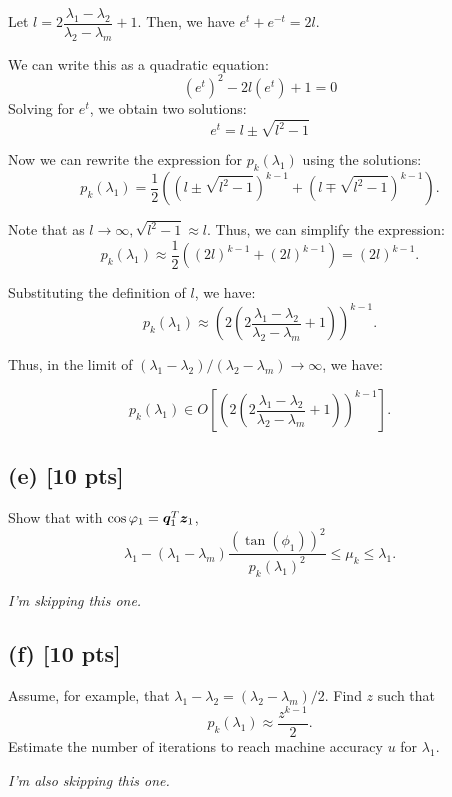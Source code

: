 \documentclass[twoside,10pt]{article}
\begin{document}
Let $l = 2\dfrac{\lambda_1 - \lambda_2}{\lambda_2 - \lambda_m} + 1$.
Then, we have $e^t + e^{-t} = 2l.$

We can write this as a quadratic equation:
$$(e^t)^2 - 2l(e^t) + 1 = 0$$
Solving for $e^t$, we obtain two solutions:
$$e^t = l \pm \sqrt{l^2 - 1}$$

Now we can rewrite the expression for $p_k(\lambda_1)$ using the solutions:
$$p_k(\lambda_1) = \frac{1}{2}\left( (l \pm \sqrt{l^2 - 1})^{k-1} + (l \mp \sqrt{l^2 - 1})^{k-1} \right).$$

Note that as $l \rightarrow \infty, \sqrt{l^2 - 1} \approx l$.
Thus, we can simplify the expression:
$$p_k(\lambda_1) \approx \frac{1}{2}\left( (2l)^{k-1} + (2l)^{k-1}\right) = (2l)^{k-1}.$$

Substituting the definition of $l$, we have:
$$p_k(\lambda_1) \approx \left(2 \left(2 \frac{\lambda_1 - \lambda_2}{\lambda_2 - \lambda_m} + 1\right)\right)^{k - 1}.$$

Thus, in the limit of $(\lambda_{1} - \lambda_{2}) / (\lambda_{2} - \lambda_{m}) \rightarrow \infty$, we have:

$$p_k(\lambda_1) \in O\left[ \left(2 \left(2 \frac{\lambda_1 - \lambda_2}{\lambda_2 - \lambda_m} + 1\right)\right)^{k - 1} \right].$$

\subsection*{(e) [10 pts]}
Show that with $\cos{\varphi_1} = \bm{q}_1^T \bm{z}_1$, 
\begin{equation}
  \lambda_{1} - (\lambda_{1} - \lambda_{m}) \frac{(\tan (\phi_1))^2}{p_{k}(\lambda_1)^2} \leq \mu_{k} \leq \lambda_1.
\end{equation}

\textit{I'm skipping this one.}

\subsection*{(f) [10 pts]}

Assume, for example, that $\lambda_1 - \lambda_2 = (\lambda_2 - \lambda_m) / 2.$  
Find $z$ such that 
\begin{equation}
  p_k (\lambda_1) \approx \frac{z^{k - 1}}{2}.
\end{equation}
Estimate the number of iterations to reach machine accuracy $u$ for $\lambda_1$. 

\textit{I'm also skipping this one.}
\end{document}
